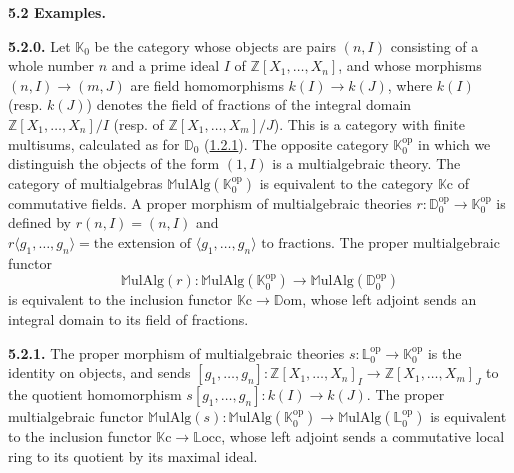 \documentclass{article}
\newenvironment{rmenv}[1]
  {\phantomsection\par\medskip\noindent\textbf{#1.}\rmfamily}
  {\medskip}
\newcommand{\bb}[1]{{\mathbb{#1}}}
\newcommand{\op}{{\mathrm{op}}}
\newcommand{\MulAlg}{\mathbb{M}\mathrm{ulAlg}}
\newcommand{\Dom}{\mathbb{D}\mathrm{om}}
\newcommand{\Locc}{\mathbb{L}\mathrm{occ}}
\begin{document}
\begin{rmenv}{5.2 Examples}
\label{5.2}

  \begin{rmenv}{5.2.0}
  \label{5.2.0}
    Let $\bb{K}_0$ be the category whose objects are pairs $(n,I)$ consisting of a whole number $n$ and a prime ideal $I$ of $\bb{Z}[X_1,\ldots,X_n]$, and whose morphisms $(n,I)\to(m,J)$ are field homomorphisms $k(I)\to k(J)$, where $k(I)$ (resp. $k(J)$) denotes the field of fractions of the integral domain $\bb{Z}[X_1,\ldots,X_n]/I$ (resp. of $\bb{Z}[X_1,\ldots,X_m]/J$).
    This is a category with finite multisums, calculated as for $\bb{D}_0$ (\hyperref[1.2.1]{1.2.1}).
    The opposite category $\bb{K}_0^\op$ in which we distinguish the objects of the form $(1,I)$ is a multialgebraic theory.
    The category of multialgebras $\MulAlg(\bb{K}_0^\op)$ is equivalent to the category $\bb{K}\mathrm{c}$ of commutative fields.
    A proper morphism of multialgebraic theories $r\colon\bb{D}_0^\op\to\bb{K}_0^\op$ is defined by $r(n,I)=(n,I)$ and $r\langle g_1,\ldots,g_n\rangle=\mbox{the extension of $\langle g_1,\ldots,g_n\rangle$ to fractions}$.
    The proper multialgebraic functor
    \[
      \MulAlg(r)\colon \MulAlg(\bb{K}_0^\op) \to \MulAlg(\bb{D}_0^\op)
    \]
    is equivalent to the inclusion functor $\bb{K}\mathrm{c}\to\Dom$, whose left adjoint sends an integral domain to its field of fractions.
  \end{rmenv}

  \begin{rmenv}{5.2.1}
  \label{5.2.1}
    The proper morphism of multialgebraic theories $s\colon\bb{L}_0^\op\to\bb{K}_0^\op$ is the identity on objects, and sends $[g_1,\ldots,g_n]\colon\bb{Z}[X_1,\ldots,X_n]_I\to\bb{Z}[X_1,\ldots,X_m]_J$ to the quotient homomorphism $s[g_1,\ldots,g_n]\colon k(I)\to k(J)$.
    The proper multialgebraic functor $\MulAlg(s)\colon\MulAlg(\bb{K}_0^\op)\to\MulAlg(\bb{L}_0^\op)$ is equivalent to the inclusion functor $\bb{K}\mathrm{c}\to\Locc$, whose left adjoint sends a commutative local ring to its quotient by its maximal ideal.
  \end{rmenv}


\end{rmenv}
\end{document}

